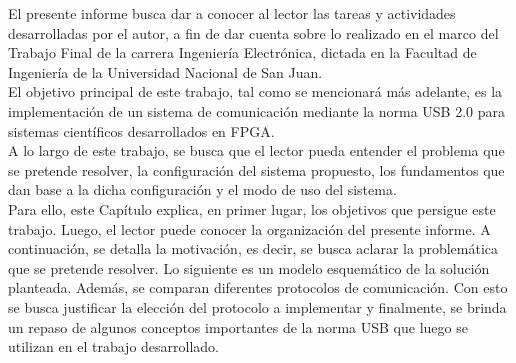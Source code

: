 El presente informe busca dar a conocer al lector las tareas y actividades desarrolladas por el autor, a fin de dar cuenta sobre lo realizado en el marco del Trabajo Final de la carrera Ingeniería Electrónica, dictada en la Facultad de Ingeniería de la Universidad Nacional de San Juan.\\

El objetivo principal de este trabajo, tal como se mencionará más adelante, es la implementación de un sistema de comunicación mediante la norma USB 2.0 para sistemas científicos desarrollados en FPGA.\\

A lo largo de este trabajo, se busca que el lector pueda entender el problema que se pretende resolver, la configuración del sistema propuesto, los fundamentos que dan base a la dicha configuración y el modo de uso del sistema.\\

Para ello, este Capítulo explica, en primer lugar, los objetivos que persigue este trabajo. Luego, el lector puede conocer la organización del presente informe. A continuación, se detalla la motivación, es decir, se busca aclarar la problemática que se pretende resolver. Lo siguiente es un modelo esquemático de la solución planteada. Además, se comparan diferentes protocolos de comunicación. Con esto se busca justificar la elección del protocolo a implementar y finalmente, se brinda un repaso de algunos conceptos importantes de la norma USB que luego se utilizan en el trabajo desarrollado.\\ 